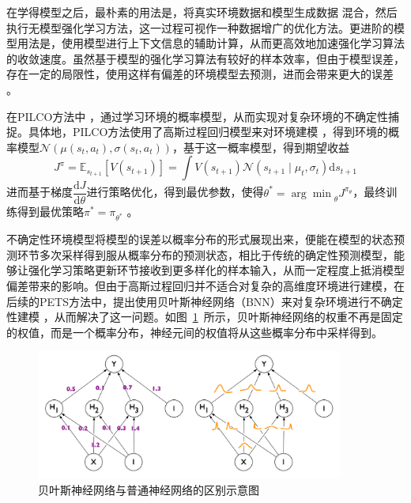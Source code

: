 在学得模型之后，最朴素的用法是，将真实环境数据和模型生成数据 混合，然后执行无模型强化学习方法，这一过程可视作一种数据增广的优化方法。更进阶的模型用法是，使用模型进行上下文信息的辅助计算，从而更高效地加速强化学习算法的收敛速度。虽然基于模型的强化学习算法有较好的样本效率，但由于模型误差，存在一定的局限性，使用这样有偏差的环境模型去预测，进而会带来更大的误差 \cite{zambaldi2018deep}。

在PILCO方法中 \cite{deisenroth2011pilco}，通过学习环境的概率模型，从而实现对复杂环境的不确定性捕捉。具体地，PILCO方法使用了高斯过程回归模型来对环境建模 \cite{quinonero2005unifying}，得到环境的概率模型$\mathcal{N}\left(\mu(s_t,a_t), \sigma(s_t,a_t)\right)$，基于这一概率模型，得到期望收益
\begin{equation}
    J^\pi=\mathbb{E}_{s_{t+1}}\left[V\left(s_{t+1}\right)\right]=\int V\left(s_{t+1}\right) \mathcal{N}\left(s_{t+1} \mid \mu_t, \sigma_t\right) \mathrm{d} s_{t+1}
\end{equation}
进而基于梯度$\dfrac{\mathrm{d}J}{\mathrm{d}\theta}$进行策略优化，得到最优参数，使得$\theta^* = {\arg\min}_\theta J^{\pi_\theta}$，最终训练得到最优策略$\pi^*=\pi_{\theta^*}$ 。\cite{peters2006policy}

不确定性环境模型将模型的误差以概率分布的形式展现出来，便能在模型的状态预测环节多次采样得到服从概率分布的预测状态，相比于传统的确定性预测模型，能够让强化学习策略更新环节接收到更多样化的样本输入，从而一定程度上抵消模型偏差带来的影响。但由于高斯过程回归并不适合对复杂的高维度环境进行建模，在后续的PETS方法中，提出使用贝叶斯神经网络（BNN）来对复杂环境进行不确定性建模 \cite{Blundell2015WeightNetworks}，从而解决了这一问题。如图~\ref{fig:BNN}~所示，贝叶斯神经网络的权重不再是固定的权值，而是一个概率分布，神经元间的权值将从这些概率分布中采样得到。

\begin{figure}[tbh]
\centering
\includegraphics[width=0.9\textwidth]{figures/BNN.png}
\caption{贝叶斯神经网络与普通神经网络的区别示意图}
\label{fig:BNN}
\end{figure}

